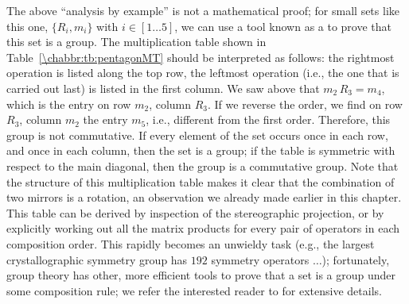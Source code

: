 The above ``analysis by example'' is not a mathematical proof; for small sets like this one, $\{R_i,m_i\}$ with $i\in[1\ldots 5]$, we can use a tool known as a  to prove that this set is a group.  The multiplication table shown in Table~\ref{\chabbr:tb:pentagonMT} should be interpreted as follows: the rightmost operation is listed along the top row, the leftmost operation (i.e., the one that is carried out last) is listed in the first column.  We saw above that $m_2\, R_3=m_4$, which is the entry on row $m_2$, column $R_3$.  If we reverse the order, we find on row $R_3$, column $m_2$ the entry $m_5$, i.e., different from the first order.  Therefore, this group is not commutative.  If every element of the set occurs once in each row, and once in each column, then the set is a group; if the table is symmetric with respect to the main diagonal, then the group is a commutative group.
Note that the structure of this multiplication table makes it clear that the combination of two mirrors is a rotation, an observation we already made earlier in this chapter.  This table can be derived by inspection of the stereographic projection, or by explicitly working out all the matrix products for every pair of operators in each composition order. This rapidly becomes an unwieldy task (e.g., the largest crystallographic symmetry group has $192$ symmetry operators $\ldots$); fortunately, group theory has other, more efficient tools to prove that a set is a group under some composition rule; we refer the interested reader to \cite{zhao2021a} for extensive details.

